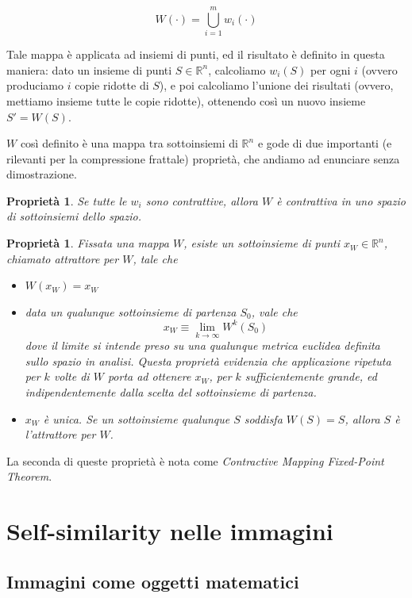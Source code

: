 \documentclass[11pt,a4paper,appendixprefix=true,numbers=noenddot]{scrreprt}
\newtheorem{proprieta}[teorema]{Proprietà}
\begin{document}
\[
W(\cdot) = \bigcup_{i=1}^{m} w_i(\cdot)
\]

Tale mappa è applicata ad insiemi di punti, ed il risultato è definito in questa maniera: dato un insieme di punti $S \in \mathbb{R}^n$, calcoliamo $w_i(S)$ per ogni $i$ (ovvero produciamo $i$ copie ridotte di $S$), e poi calcoliamo l'unione dei risultati (ovvero, mettiamo insieme tutte le copie ridotte), ottenendo così un nuovo insieme $S' = W(S)$.

$W$ così definito è una mappa tra sottoinsiemi di $\mathbb{R}^n$ e gode di due importanti (e rilevanti per la compressione frattale) proprietà, che andiamo ad enunciare senza dimostrazione.

\begin{proprieta}
Se tutte le $w_i$ sono contrattive, allora $W$ è contrattiva in uno spazio di sottoinsiemi dello spazio.
\end{proprieta}

\begin{proprieta}
Fissata una mappa $W$, esiste un sottoinsieme di punti $x_W \in \mathbb{R}^n$, chiamato \emph{attrattore per $W$}, tale che
\begin{itemize}
\item $W(x_W) = x_W$
\item data un qualunque sottoinsieme di partenza $S_0$, vale che 
\[x_W \equiv \lim_{k \rightarrow \infty} W^{k}(S_0) \]
dove il limite si intende preso su una qualunque metrica euclidea definita sullo spazio in analisi.
Questa proprietà evidenzia che applicazione ripetuta per $k$ volte di $W$ porta ad ottenere $x_W$, per $k$ sufficientemente grande, ed indipendentemente dalla scelta del sottoinsieme di partenza.
\item $x_W$ è unica. Se un sottoinsieme qualunque $S$ soddisfa $W(S) = S$, allora $S$ è l'attrattore per $W$.
\end{itemize}
\end{proprieta}

La seconda di queste proprietà è nota come \emph{Contractive Mapping Fixed-Point Theorem}.

\section{Self-similarity nelle immagini}

\subsection*{Immagini come oggetti matematici}
\end{document}
